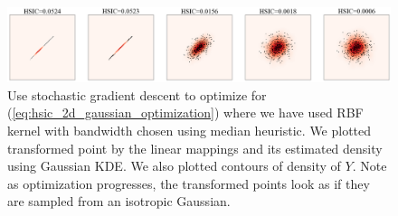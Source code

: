 \documentclass[11pt]{article}
\begin{document}
\begin{figure}[h!]
    \begin{center} 
        \includegraphics[width=\textwidth]{assets/hsic_2d_gaussian} 
        \caption{Use stochastic gradient descent to optimize for (\ref{eq:hsic_2d_gaussian_optimization}) where we have used RBF kernel with bandwidth chosen using median heuristic. We plotted transformed point by the linear mappings and its estimated density using Gaussian KDE. We also plotted contours of density of $Y$. Note as optimization progresses, the transformed points look as if they are sampled from an isotropic Gaussian.}
        \label{fig:hsic_2d_gaussian}
    \end{center}
    \end{figure}
    


 

\newpage
\printbibliography 
\end{document}
